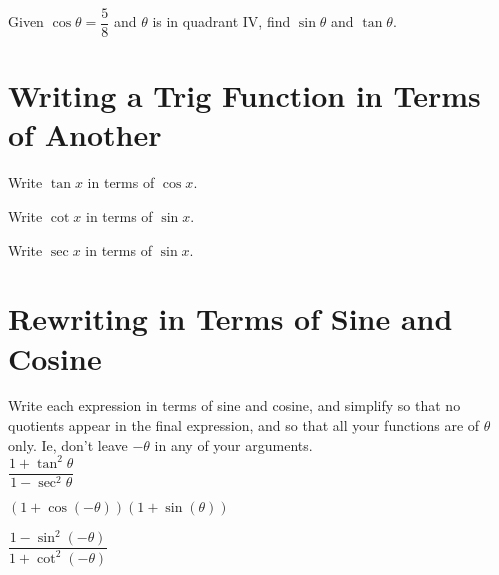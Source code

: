 \documentclass[paper=letter]{article}
\begin{document}
\begin{center}
\end{center}\vspace{1cm}%

\prob Given $\cos \theta = \dfrac{5}{8}$ and $\theta$ is in quadrant IV, find $\sin \theta$ and $\tan \theta$.

\newpage
\section*{Writing a Trig Function in Terms of Another}

\prob Write $\tan x$ in terms of $\cos x$.\vfill

\prob Write $\cot x$ in terms of $\sin x$.\vfill

\prob Write $\sec x$ in terms of $\sin x$.\vfill

\newpage
\section*{Rewriting in Terms of Sine and Cosine}

Write each expression in terms of sine and cosine, and simplify so that no quotients appear in the final expression, and so that all your functions are of $\theta$ only.  Ie, don't leave $-\theta$ in any of your arguments.\\

\prob $\dfrac{1 + \tan^2 \theta}{1 - \sec^2 \theta}$\vfill

\prob $\left(1 + \cos(-\theta)\right)\left(1 + \sin(\theta)\right)$\vfill

\prob $\dfrac{1 - \sin^2\left(-\theta\right)}{1 + \cot^2\left(-\theta\right)}$\vfill
\end{document}
